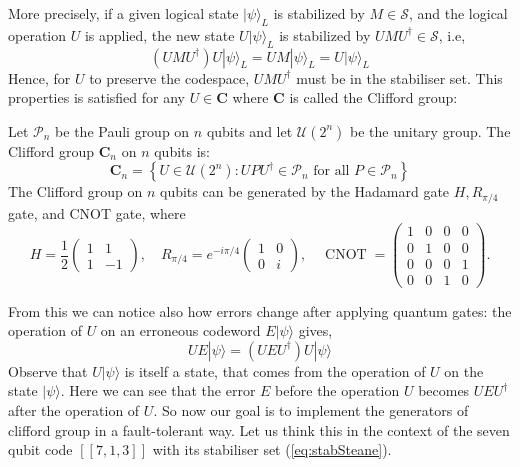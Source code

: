 More precisely, if a given logical state $|\psi\rangle_{L}$ is stabilized by $M \in \mathcal{S}$, and the logical operation $U$ is applied, the new state $U|\psi\rangle_{L}$ is stabilized by $U M U^{\dagger} \in \mathcal{S}$, i.e,
\begin{equation}
(U M U^{\dagger}) U|\psi\rangle_{L}=U M|\psi\rangle_{L}=U|\psi\rangle_{L}
\end{equation}
Hence, for $U$ to preserve the codespace, $U M U^{\dagger}$ must be in the stabiliser set.
This properties is satisfied for any $U \in \mathbf{C}$ where $\mathbf{C}$ is called the Clifford group:
\begin{definition}
Let $\mathcal{P}_{n}$ be the Pauli group on $n$ qubits and let $\mathcal{U}\left(2^{n}\right)$ be the unitary group. The Clifford group $\mathbf{C}_{n}$ on $n$ qubits is:
\begin{equation}
\mathbf{C}_{n}=\left\{U \in \mathcal{U}\left(2^{n}\right): U P U^{\dagger} \in \mathcal{P}_{n} \text { for all } P \in \mathcal{P}_{n}\right\}
\end{equation}
The Clifford group on $n$ qubits can be generated by the Hadamard gate $H, R_{\pi / 4}$ gate, and CNOT gate, where
$$
H=\frac{1}{2}\left(\begin{array}{cc}
1 & 1 \\
1 & -1
\end{array}\right), \quad R_{\pi / 4}=e^{-i \pi / 4}\left(\begin{array}{cc}
1 & 0 \\
0 & i
\end{array}\right), \quad \operatorname{CNOT}=\left(\begin{array}{cccc}
1 & 0 & 0 & 0 \\
0 & 1 & 0 & 0 \\
0 & 0 & 0 & 1 \\
0 & 0 & 1 & 0
\end{array}\right) .
$$
\end{definition}
From this we can notice also how errors change after applying quantum gates: 
the operation of $U$ on an erroneous codeword $E|\psi\rangle$ gives,
\begin{equation}
U E|\psi\rangle=\left(U E U^{\dagger}\right) U|\psi\rangle
\label{eq:spread}
\end{equation}
Observe that $U|\psi\rangle$ is itself a state, that comes from the operation of $U$ on the state $|\psi\rangle$.
Here we can see that the error $E$ before the operation $U$ becomes $U E U^{\dagger}$ after the operation of $U$. 
So now our goal is to implement the generators of clifford group in a fault-tolerant way. Let us think this in the context of the seven qubit code $[[7,1,3]]$ with its stabiliser set (\ref{eq:stabSteane}). 

